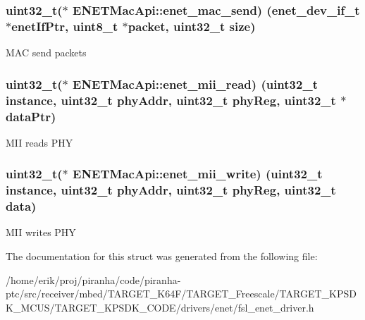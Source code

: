 \subsubsection[{\texorpdfstring{enet\+\_\+mac\+\_\+send}{enet_mac_send}}]{\setlength{\rightskip}{0pt plus 5cm}uint32\+\_\+t($\ast$  E\+N\+E\+T\+Mac\+Api\+::enet\+\_\+mac\+\_\+send) ({\bf enet\+\_\+dev\+\_\+if\+\_\+t} $\ast$enet\+If\+Ptr, uint8\+\_\+t $\ast$packet, uint32\+\_\+t size)}\hypertarget{structENETMacApi_a17dab812d1907002224b2baa72a6fffe}{}\label{structENETMacApi_a17dab812d1907002224b2baa72a6fffe}
M\+AC send packets 
\subsubsection[{\texorpdfstring{enet\+\_\+mii\+\_\+read}{enet_mii_read}}]{\setlength{\rightskip}{0pt plus 5cm}uint32\+\_\+t($\ast$  E\+N\+E\+T\+Mac\+Api\+::enet\+\_\+mii\+\_\+read) (uint32\+\_\+t instance, uint32\+\_\+t phy\+Addr, uint32\+\_\+t phy\+Reg, uint32\+\_\+t $\ast$data\+Ptr)}\hypertarget{structENETMacApi_a80c2c85982eb99a2576d4027d7fae09f}{}\label{structENETMacApi_a80c2c85982eb99a2576d4027d7fae09f}
M\+II reads P\+HY 
\subsubsection[{\texorpdfstring{enet\+\_\+mii\+\_\+write}{enet_mii_write}}]{\setlength{\rightskip}{0pt plus 5cm}uint32\+\_\+t($\ast$  E\+N\+E\+T\+Mac\+Api\+::enet\+\_\+mii\+\_\+write) (uint32\+\_\+t instance, uint32\+\_\+t phy\+Addr, uint32\+\_\+t phy\+Reg, uint32\+\_\+t data)}\hypertarget{structENETMacApi_a33c4e5a8bd34bbb4dd2e8a8dd19808d5}{}\label{structENETMacApi_a33c4e5a8bd34bbb4dd2e8a8dd19808d5}
M\+II writes P\+HY 

The documentation for this struct was generated from the following file\+:\begin{DoxyCompactItemize}
\item 
/home/erik/proj/piranha/code/piranha-\/ptc/src/receiver/mbed/\+T\+A\+R\+G\+E\+T\+\_\+\+K64\+F/\+T\+A\+R\+G\+E\+T\+\_\+\+Freescale/\+T\+A\+R\+G\+E\+T\+\_\+\+K\+P\+S\+D\+K\+\_\+\+M\+C\+U\+S/\+T\+A\+R\+G\+E\+T\+\_\+\+K\+P\+S\+D\+K\+\_\+\+C\+O\+D\+E/drivers/enet/fsl\+\_\+enet\+\_\+driver.\+h\end{DoxyCompactItemize}
